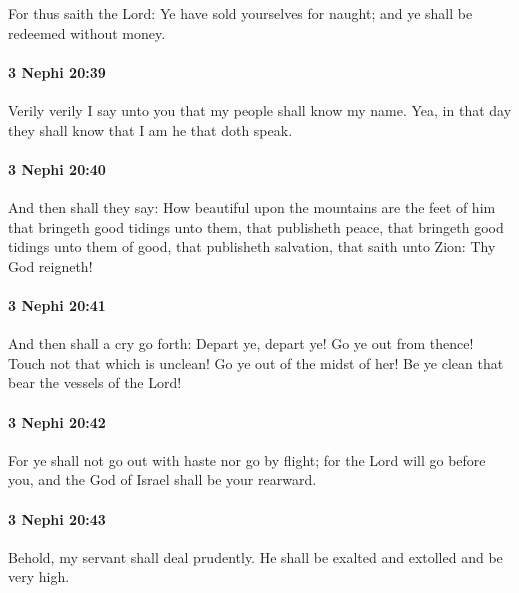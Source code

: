 			For thus saith the Lord:
			Ye have sold yourselves for naught;
			and ye shall be redeemed without money.

		\paragraph{3 Nephi 20:39} %
			\label{3NEPHI-20-39}

			Verily verily I say unto you
			that my people shall know my name.
			Yea, in that day they shall know that I am he that doth speak.

		\paragraph{3 Nephi 20:40} %
			\label{3NEPHI-20-40}

			And then shall they say:
			How beautiful upon the mountains are the feet of him
			that bringeth good tidings unto them,
			that publisheth peace,
			that bringeth good tidings unto them of good,
			that publisheth salvation,
			that saith unto Zion:
			Thy God reigneth!

		\paragraph{3 Nephi 20:41} %
			\label{3NEPHI-20-41}

			And then shall a cry go forth:
			Depart ye, depart ye!
			Go ye out from thence!
			Touch not that which is unclean!
			Go ye out of the midst of her!
			Be ye clean that bear the vessels of the Lord!

		\paragraph{3 Nephi 20:42} %
			\label{3NEPHI-20-42}

			For ye shall not go out with haste nor go by flight;
			for the Lord will go before you,
			and the God of Israel shall be your rearward.

		\paragraph{3 Nephi 20:43} %
			\label{3NEPHI-20-43}

			Behold, my servant shall deal prudently.
			He shall be exalted and extolled and be very high.

